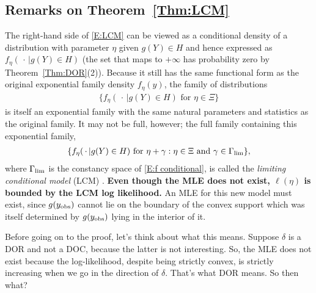 




\subsection{Remarks on Theorem~\ref{Thm:LCM}}


The right-hand side of \eqref{E:LCM} can be viewed as a conditional density of a 
distribution with parameter $\eta$ given $g(Y) \in H$ and hence expressed as $f_{\eta}
(\, \cdot\,  | g(Y) \in H)$ (the set that maps to $+\infty$ has probability zero by 
Theorem~\ref{Thm:DOR}(2)).  Because it still has the same functional form as 
the original exponential family density $f_\eta(y)$, the family of distributions
\begin{align} \label{E:f conditional}
\{ f_{\eta}(\, \cdot\,  | g(Y) \in H) \text{ for } \eta \in \Xi \}
\end{align}
is itself an exponential family with the same natural parameters and statistics as the 
original family.  
It may not be full, however; the full family containing this exponential family,
\begin{align*}
\{ f_{\eta}(\, \cdot\,  | g(Y) \in H) \text{ for }  \eta + \gamma: \eta \in \Xi \text
{ and } \gamma \in \Gamma_{\textrm{lim}} \},
\end{align*}
where $\Gamma_{\textrm{lim}}$ is the constancy space of \eqref{E:f conditional},
is called the \emph{limiting conditional model} (LCM) \citep{Geyer:gdor}.  
\textbf{Even though the MLE does not exist, $\ell(\eta)$ is bounded by the LCM log 
likelihood.}
An MLE for this new model must exist, since $g(y_{\textrm{obs}})$ cannot lie on the boundary of 
the convex support which was itself determined by $g(y_{\textrm{obs}})$ lying in the interior of 
it.  

Before going on to the proof, let's think about what this means.  Suppose $\delta$ is 
a DOR and not a DOC, because the latter is not interesting.  So, the MLE does not 
exist because the log-likelihood, despite being strictly convex, is strictly 
increasing when we go in the direction of $\delta$.  That's what DOR means.  So then 
what?


